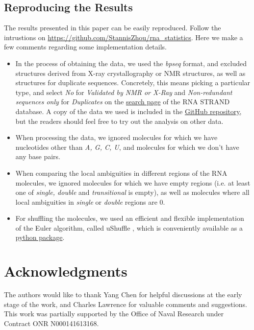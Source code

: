 \documentclass[10pt,letterpaper]{article}
\begin{document}
\subsection*{Reproducing the Results}
The results presented in this paper can be easily reproduced. Follow the intrustions on \url{https://github.com/StannisZhou/rna_statistics}. Here we make a few comments regarding some implementation details.
\begin{itemize}
	\item In the process of obtaining the data, we used the \textit{bpseq} format, and excluded structures derived from X-ray crystallography or NMR structures, as well as structures for duplicate sequences. Concretely, this means picking a particular type, and select \textit{No} for \textit{Validated by NMR or X-Ray} and \textit{Non-redundant sequences only} for \textit{Duplicates} on the \href{http://www.rnasoft.ca/strand/search.php}{search page} of the RNA STRAND database. A copy of the data we used is included in the \href{https://github.com/StannisZhou/rna_statistics/tree/master/data}{GitHub repository}, but the readers should feel free to try out the analysis on other data.
	\item When processing the data, we ignored molecules for which we have nucleotides other than \textit{A, G, C, U}, and molecules for which we don't have any base pairs.
	\item When comparing the local ambiguities in different regions of the RNA molecules, we ignored molecules for which we have empty regions (i.e. at least one of \textit{single, double} and \textit{transitional} is empty), as well as molecules where all local ambiguities in \textit{single} or \textit{double} regions are 0.
	\item For shuffling the molecules, we used an efficient and flexible implementation of the Euler algorithm\cite{Kandel1996-kz, Fitch1983-ec, Altschul1985-nq}, called uShuffle \cite{Jiang2008-yj}, which is conveniently available as a \href{https://github.com/guma44/ushuffle}{python package}.
\end{itemize}

\section*{Acknowledgments}
The authors would like to thank Yang Chen for helpful discussions at the early stage of the work, and Charles Lawrence for valuable comments and suggestions. This work was partially supported by the Office of Naval Research under Contract ONR N000141613168.

\nolinenumbers


\end{document}
